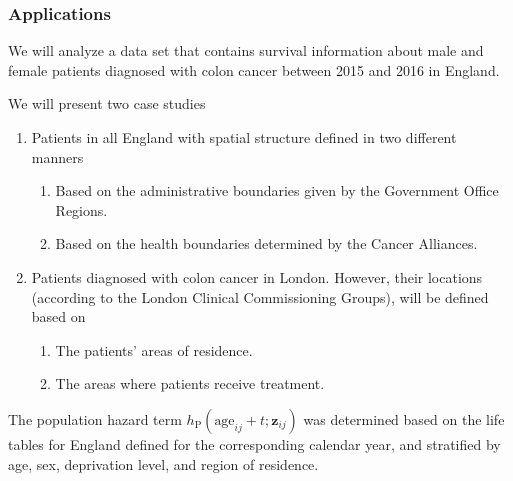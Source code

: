 \documentclass[10pt, aspectratio = 169, handout]{beamer} %
\begin{document}
    \begin{frame}[t]
		\frametitle{Applications}
		\justifying

        We will analyze a data set that contains survival information about male and female patients diagnosed with colon cancer between 2015 and 2016 in England.
        
        We will present two case studies \pause
        \begin{enumerate} \justifying
            \item Patients in all England with spatial structure defined in two different manners
            \vspace{5pt} \
            \begin{enumerate}
                \item Based on the administrative boundaries given by the Government Office Regions.
                \item Based on the health boundaries determined by the Cancer Alliances.
            \end{enumerate} \pause
            \vspace{5pt}
            \item Patients diagnosed with colon cancer in London. However, their locations (according to the London Clinical Commissioning Groups), will be defined based on
            \vspace{5pt}
            \begin{enumerate}
                \item The patients' areas of residence.
                \item The areas where patients receive treatment.
            \end{enumerate}
        \end{enumerate}
        
The population hazard term $h_{\text{P}}(\text{age}_{ij} + t; \mathbf{z}_{ij})$ was determined based on the life tables for England defined for the corresponding calendar year, and stratified by age, sex, deprivation level, and region of residence. 


	\end{frame}
\end{document}
